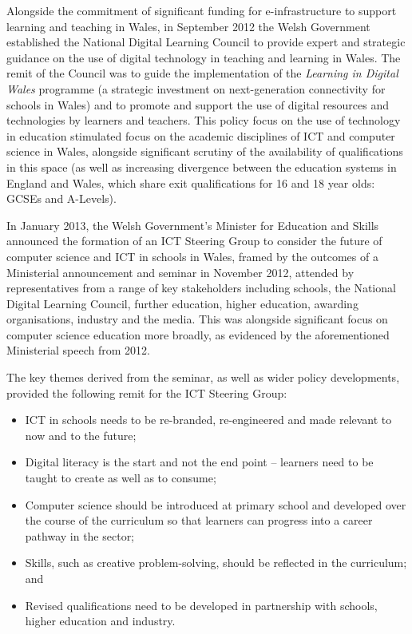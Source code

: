\documentclass{sig-alternate}
\begin{document}
Alongside the commitment of significant funding for e-infrastructure
to support learning and teaching in Wales, in September 2012 the Welsh
Government established the National Digital Learning Council to
provide expert and strategic guidance on the use of digital technology
in teaching and learning in Wales.  The remit of the Council was to
guide the implementation of the {\emph{Learning in Digital Wales}}
programme (a strategic investment on next-generation connectivity for
schools in Wales) and to promote and support the use of digital
resources and technologies by learners and teachers. This policy focus
on the use of technology in education stimulated focus on the academic
disciplines of ICT and computer science in Wales, alongside
significant scrutiny of the availability of
qualifications~\cite{raeng-comp-quals:2012} in this space (as well as
increasing divergence between the education systems in England and
Wales, which share exit qualifications for 16 and 18 year olds: GCSEs
and A-Levels).


In January 2013, the Welsh Government's Minister for Education and
Skills announced the formation of an ICT Steering Group to consider
the future of computer science and ICT in schools in Wales, framed by
the outcomes of a Ministerial announcement and seminar in November
2012, attended by representatives from a range of key stakeholders
including schools, the National Digital Learning Council, further
education, higher education, awarding organisations, industry and the
media. This was alongside significant focus on computer science
education more broadly, as evidenced by the aforementioned Ministerial
speech from 2012.

The key themes derived from the seminar, as well as wider policy
developments, provided the following remit for the ICT Steering Group:

\begin{itemize}
\item ICT in schools needs to be re-branded, re-engineered and made
relevant to now and to the future;
\item Digital literacy is the start and not the end point -- learners
need to be taught to create as well as to consume;
\item Computer science should be introduced at primary school and
developed over the course of the curriculum so that learners can
progress into a career pathway in the sector;
\item Skills, such as creative problem-solving, should be reflected in
the curriculum; and
\item Revised qualifications need to be developed in partnership with
schools, higher education and industry.
\end{itemize}
\end{document}
